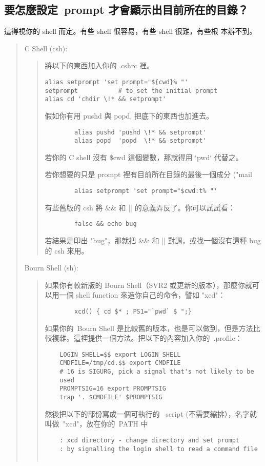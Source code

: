 \documentclass{article}
\begin{document}
\begin{CJK*}{Bg5}{ming}
\subsection{要怎麼設定~prompt 才會顯示出目前所在的目錄？}
	
	這得視你的 shell 而定。有些 shell 很容易，有些 shell 很難，有些根
	本辦不到。
\begin{quote}
	C Shell (csh):
	\begin{quote}
	  將以下的東西加入你的 .cshrc 裡。
\begin{verbatim}
alias setprompt 'set prompt="${cwd}% "'
setprompt           # to set the initial prompt
alias cd 'chdir \!* && setprompt'
\end{verbatim}
	  假如你有用 pushd 與 popd, 把底下的東西也加進去。
\begin{verbatim}
		alias pushd 'pushd \!* && setprompt'
		alias popd  'popd  \!* && setprompt'
\end{verbatim}
	  若你的 C shell 沒有 \$cwd 這個變數，那就得用 `pwd` 代替之。

	  若你想要的只是 prompt 裡有目前所在目錄的最後一個成分
	  ("mail%
\begin{verbatim}
		alias setprompt 'set prompt="$cwd:t% "'
\end{verbatim}
	  有些舊版的 csh 將 \&\& 和 || 的意義弄反了。你可以試試看：
\begin{verbatim}
		false && echo bug
\end{verbatim}
	  若結果是印出 "bug"，那就把 \&\& 和 || 對調，或找一個沒有這種 
	  bug 的 csh 來用。
	\end{quote}

	Bourn Shell (sh):
	\begin{quote}
	  如果你有較新版的 Bourn Shell（SVR2 或更新的版本），那麼你就可
	  以用一個 shell function 來造你自己的命令，譬如 "xcd"：
\begin{verbatim}
		xcd() { cd $* ; PS1="`pwd` $ ";}
\end{verbatim}
	  如果你的~Bourn Shell 是比較舊的版本，也是可以做到，但是方法比
	  較複雜。這裡提供一個方法。把以下的內容加入你的~.profile：
\small
\begin{verbatim}
	LOGIN_SHELL=$$ export LOGIN_SHELL
	CMDFILE=/tmp/cd.$$ export CMDFILE
	# 16 is SIGURG, pick a signal that's not likely to be 
	used
	PROMPTSIG=16 export PROMPTSIG
	trap '. $CMDFILE' $PROMPTSIG
\end{verbatim}
\normalsize
	然後把以下的部份寫成一個可執行的 ~script (不需要縮排），名字就
	叫做~"xcd"，放在你的~PATH 中
\small
\begin{verbatim}
	: xcd directory - change directory and set prompt
	: by signalling the login shell to read a command file


\end{verbatim}
\end{quote}
\end{quote}
\end{CJK*}
\end{document}

